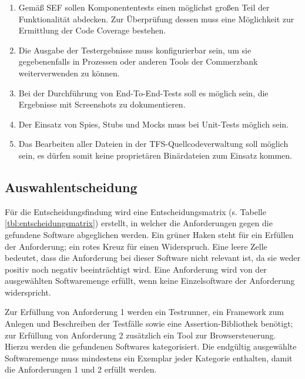 \begin{enumerate}
	\item Gemäß SEF sollen Komponententests \glqq einen möglichst großen Teil der Funktionalität abdecken\grqq{}\cite{coba-sef}. Zur Überprüfung dessen muss eine Möglichkeit zur Ermittlung der Code Coverage bestehen.
	\item Die Ausgabe der Testergebnisse muss konfigurierbar sein, um sie gegebenenfalls in Prozessen oder anderen Tools der Commerzbank weiterverwenden zu können.
	\item Bei der Durchführung von End-To-End-Tests soll es möglich sein, die Ergebnisse mit Screenshots zu dokumentieren.
	\item Der Einsatz von Spies, Stubs und Mocks muss bei Unit-Tests möglich sein.
	\item Das Bearbeiten aller Dateien in der TFS-Quellcodeverwaltung soll möglich sein, es dürfen somit keine proprietären Binärdateien zum Einsatz kommen.
\end{enumerate}

\newpage


\newpage
\subsection{Auswahlentscheidung}
\label{sec:auswahlentscheidung}
Für die Entscheidungsfindung wird eine Entscheidungsmatrix (s. Tabelle \ref{tbl:entscheidungsmatrix}) erstellt, in welcher die Anforderungen gegen die gefundene Software abgeglichen werden. Ein grüner Haken steht für ein Erfüllen der Anforderung; ein rotes Kreuz für einen Widerspruch. Eine leere Zelle bedeutet, dass die Anforderung bei dieser Software nicht relevant ist, da sie weder positiv noch negativ beeinträchtigt wird. Eine Anforderung wird von der ausgewählten Softwaremenge erfüllt, wenn keine Einzelsoftware der Anforderung widerspricht.

Zur Erfüllung von Anforderung 1 werden ein Testrunner, ein Framework zum Anlegen und Beschreiben der Testfälle sowie eine Assertion-Bibliothek benötigt; zur Erfüllung von Anforderung 2 zusätzlich ein Tool zur Browsersteuerung. Hierzu werden die gefundenen Softwares  kategorisiert. Die endgültig ausgewählte Softwaremenge muss mindestens ein Exemplar jeder Kategorie enthalten, damit die Anforderungen 1 und 2 erfüllt werden.

